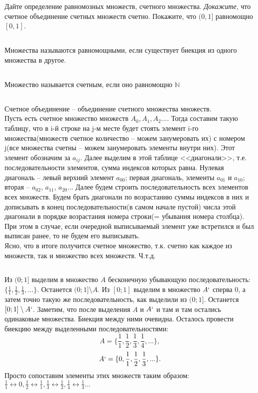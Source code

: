 Дайте определение равномозных множеств, счетного множества. \textit{Докажите}, что счетное объединение счетных множеств счетно. Покажите, что $(0,1] $ равномощно $ [0, 1]$.
\subsection{}
Множества называются равномощными, если существует биекция из одного множества в другое.
\subsection{}
Множество называется счетным, если оно равномощно $\mathbb{N}$
\subsection{}
Счетное объединение -- объединение счетного множества множеств.\\
Пусть есть счетное множество множеств $A_0, A_1, A_2 ... $. Тогда составим такую таблицу, что в i-й строке на j-м месте будет стоять элемент i-го множества(множеств счетное количество -- можем занумеровать их) с номером j(все множества счетны -- можем занумеровать элементы внутри них). Этот элемент обозначим за $a_{ij}$. Далее выделим в этой таблице <<диагонали>>, т.е. последовательности элементов, сумма индексов которых равна. Нулевая диагональ -- левый верхний элемент $a_{00}$; первая диагональ, элементы $a_{01}$ и $a_{10}$; вторая -- $a_{02}$, $a_{11}$, $a_{20}$... Далее будем строить последовательность всех элементов всех множеств. Будем брать диагонали по возрастанию суммы индексов в них и дописывать в конец последовательности(в самом начале пустой) числа этой диагонали в порядке возрастания номера строки(= убывания номера столбца). При этом в случае, если очередной выписываемый элемент уже встретился и был выписан ранее, то не будем его выписывать.\\
Ясно, что в итоге получится счетное множество, т.к. счетно как каждое из множеств, так и множество всех множеств. Ч.т.д.
\subsection{}
Из $(0;1]$ выделим в множество $A$ бесконечную убывающую последовательность: $\{\frac{1}{1}, \frac{1}{2},\frac{1}{3}, ...\}$. Останется $(0;1]\setminus A$. Из $[0;1]$ выделим в множество $A`$ сперва 0, а затем точно такую же последовательность, как выделили из $(0;1]$. Останется $[0;1]\setminus A`$. Заметим, что после выделения $A$ и $A`$ и там и там остались одинаковые множества. Биекция между ними очевидна. Осталось провести биекцию между выделенными последовательностями:
$$A = \{\frac{1}{1}, \frac{1}{2}, \frac{1}{3}, \frac{1}{4}, ...\},$$
$$A` = \{0, \frac{1}{1}, \frac{1}{2}, \frac{1}{3}, ...\}.$$
Просто сопоставим элементы этих множеств таким образом: $\frac{1}{1}\leftrightarrow 0, \frac{1}{2}\leftrightarrow \frac{1}{1}, \frac{1}{3}\leftrightarrow \frac{1}{2}, \frac{1}{4}\leftrightarrow \frac{1}{3} ...$
